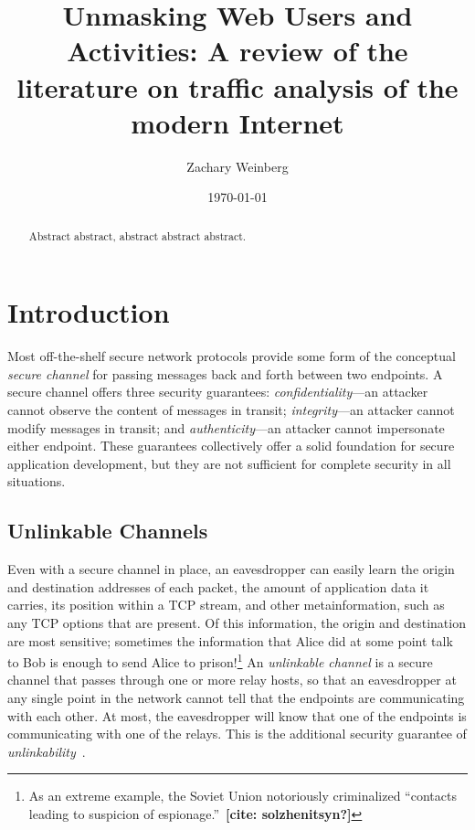 \documentclass{zarticle}
\def\todo#1{{\color{todocolor}\bfseries [#1]}}
\def\needcite#1{\todo{cite: #1}}
\begin{document}
\title{Unmasking Web Users and Activities:
  A review of the literature on traffic analysis of the modern Internet}
\author{Zachary Weinberg}
\date{\today}
\maketitle

\begin{abstract}
Abstract abstract, abstract abstract abstract.
\end{abstract}

\section{Introduction}

Most off-the-shelf secure network protocols provide some form of the
conceptual \emph{secure channel} for passing messages back and forth
between two endpoints.  A secure channel offers three security
guarantees: \emph{confidentiality}---an attacker cannot observe the
content of messages in transit; \emph{integrity}---an attacker cannot
modify messages in transit; and \emph{authenticity}---an attacker
cannot impersonate either endpoint.  These guarantees collectively
offer a solid foundation for secure application development, but they
are not sufficient for complete security in all situations.

\subsection{Unlinkable Channels}

Even with a secure channel in place, an eavesdropper can easily learn
the origin and destination addresses of each packet, the amount of
application data it carries, its position within a TCP stream, and
other metainformation, such as any TCP options that are present.  Of
this information, the origin and destination are most sensitive;
sometimes the information that Alice did at some point talk to Bob is
enough to send Alice to prison!\footnote{As an extreme example, the
  Soviet Union notoriously criminalized “contacts leading to suspicion
  of espionage.”~\needcite{solzhenitsyn?}}  An \emph{unlinkable
  channel} is a secure channel that passes through one or more relay
hosts, so that an eavesdropper at any single point in the network
cannot tell that the endpoints are communicating with each other.  At
most, the eavesdropper will know that one of the endpoints is
communicating with one of the relays.  This is the additional security
guarantee of \emph{unlinkability}~\cite{pfitzmann2010terminology}.
\end{document}
